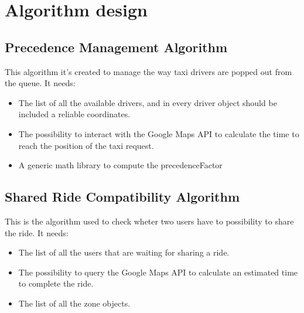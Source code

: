 

\section{Algorithm design} %
\label{sec:algorithm_design}


\subsection{Precedence Management Algorithm} %
\label{sub:first_algorithm}
This algorithm it's created to manage the way taxi drivers are popped out from the queue.
It needs:

\begin{itemize}
	\item The list of all the available drivers, and in every driver object should be included a reliable coordinates.
	\item The possibility to interact with the Google Maps API to calculate the time to reach the position of the taxi request.
	\item A generic math library to compute the precedenceFactor
\end{itemize}







\subsection{Shared Ride Compatibility Algorithm} %
\label{sub:second_algorithm}
This is the algorithm used to check wheter two users have to possibility to share the ride.
It needs:
\begin{itemize}
	\item The list of all the users that are waiting for sharing a ride.
	\item The possibility to query the Google Maps API to calculate an estimated time to complete the ride.
	\item The list of all the zone objects.
\end{itemize}

